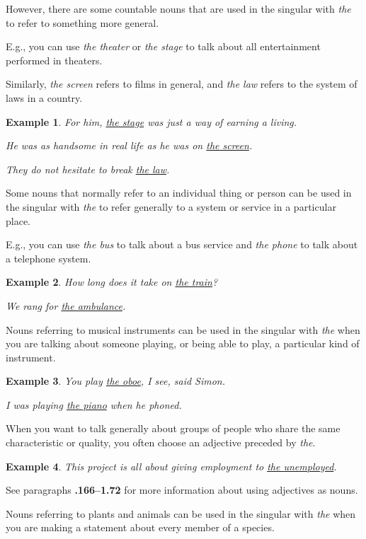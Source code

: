 \documentclass[oneside]{book}
\numberwithin{equation}{section}
\newtheorem{example}{Example}[section]
\begin{document}
%
However, there are some countable nouns that are used in the singular with \textit{the} to refer to something more general.

%
E.g., you can use \textit{the theater} or \textit{the stage} to talk about all entertainment performed in theaters.

Similarly, \textit{the screen} refers to films in general, and \textit{the law} refers to the system of laws in a country.
\begin{example}
    For him, \underline{the stage} was just a way of earning a living.
    
    He was as handsome in real life as he was on \underline{the screen}.
    
    They do not hesitate to break \underline{the law}.
\end{example}
%
Some nouns that normally refer to an individual thing or person can be used in the singular with \textit{the} to refer generally to a system or service in a particular place.

E.g., you can use \textit{the bus} to talk about a bus service and \textit{the phone} to talk about a telephone system.
\begin{example}
    How long does it take on \underline{the train}?
    
    We rang for \underline{the ambulance}.
\end{example}
Nouns referring to musical instruments can be used in the singular with \textit{the} when you are talking about someone playing, or being able to play, a particular kind of instrument.
\begin{example}
    You play \underline{the oboe}, I see, said Simon.
    
    I was playing \underline{the piano} when he phoned.
\end{example}
%
\noindent{} When you want to talk generally about groups of people who share the same characteristic or quality, you often choose an adjective preceded by \textit{the}.
\begin{example}
    This project is all about giving employment to \underline{the unemployed}.
\end{example}
See paragraphs \textbf{.166--1.72} for more information about using adjectives as nouns.

%
\noindent{} Nouns referring to plants and animals can be used in the singular with \textit{the} when you are making a statement about every member of a species.
\end{document}
